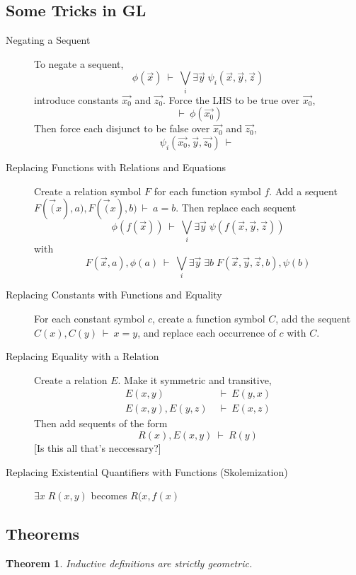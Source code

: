 \documentclass[12pt]{article}
\newtheorem{theorem}{Theorem}
\newcommand{\OR}{\bigvee}
\newcommand{\seq}[2]{#1 \ \vdash\  #2}
\newcommand{\aseq}[2]{#1 & \ \vdash\  #2}
\begin{document}
\subsection{Some Tricks in GL}
\begin{description}

\item[Negating a Sequent]
To negate a sequent,
$$ \seq{\phi(\vec{x})}
       {\OR_i \exists \vec{y}\; \psi_i(\vec{x}, \vec{y}, \vec{z})} $$
introduce constants $\vec{x_0}$ and $\vec{z_0}$. Force the LHS to be
true over $\vec{x_0}$,
$$ \seq{}{\phi(\vec{x_0})} $$
Then force each disjunct to be false over $\vec{x_0}$ and $\vec{z_0}$,
$$ \seq{\psi_i(\vec{x_0}, \vec{y}, \vec{z_0})}{} $$

\item[Replacing Functions with Relations and Equations]
Create a relation symbol $F$ for each function symbol $f$. Add a
sequent $\seq{F(\vec(x), a), F(\vec(x), b)}{a = b}$. Then replace each
sequent
$$ \seq{\phi(f(\vec{x}))}
       {\OR_i \exists \vec{y}\; \psi(f(\vec{x}, \vec{y}, \vec{z}))} $$
with
$$ \seq{F(\vec{x}, a), \phi(a)}
       {\OR_i \exists \vec{y}\; \exists b\;
              F(\vec{x}, \vec{y}, \vec{z}, b), \psi(b)} $$

\item[Replacing Constants with Functions and Equality]
For each constant symbol $c$, create a function symbol $C$, add the
sequent $\seq{C(x), C(y)}{x = y}$, and replace each occurrence of $c$
with $C$.

\item[Replacing Equality with a Relation]
Create a relation $E$. Make it symmetric and transitive,
\begin{align*}
\aseq{E(x, y)}{E(y, x)} \\
\aseq{E(x, y), E(y, z)}{E(x, z)}
\end{align*}
Then add sequents of the form
$$\seq{R(x), E(x, y)}{R(y)}$$
[Is this all that's neccessary?]

\item[Replacing Existential Quantifiers with Functions (Skolemization)]
$\exists x\; R(x, y)$ becomes $R(x, f(x)$

\end{description}


\subsection{Theorems}

\begin{theorem}
Inductive definitions are strictly geometric.
\end{theorem}
\end{document}
